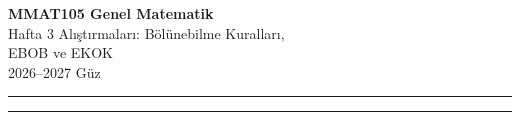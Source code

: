 \documentclass[11pt,a4paper]{article}
\newcounter{alis}
\begin{document}
\begin{minipage}[c]{\textwidth}
{\LARGE\bfseries\color{anamavi} MMAT105 Genel Matematik}\\[4pt]
{\large Hafta 3 Alıştırmaları: Bölünebilme Kuralları,\\ EBOB ve EKOK}\\[6pt]
{\small 2026--2027 Güz}
\end{minipage}

\vspace{4pt}\noindent\textcolor{anamavi}{\rule{\textwidth}{1pt}}



\vspace{6pt}
\noindent\textcolor{anamavi}{\rule{\textwidth}{0.5pt}}\\
{\small }
\end{document}
